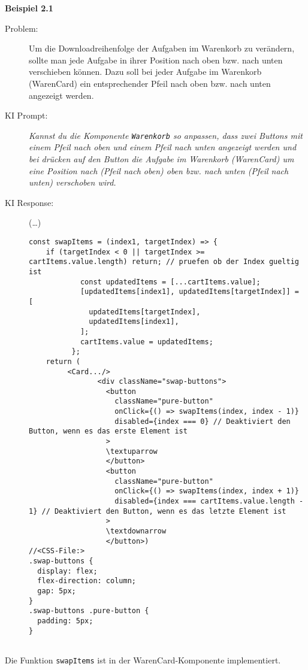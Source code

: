 \textbf{Beispiel 2.1} 
\begin{description}
    \item[Problem:] 
Um die Downloadreihenfolge der Aufgaben im Warenkorb zu verändern, sollte man jede Aufgabe in ihrer Position nach oben bzw. nach unten verschieben können. Dazu soll bei jeder Aufgabe im Warenkorb (WarenCard) ein entsprechender Pfeil nach oben bzw. nach unten angezeigt werden. 
    \item[KI Prompt:] \emph{ Kannst du die Komponente \texttt{Warenkorb} so anpassen, dass zwei Buttons mit einem Pfeil nach oben und einem Pfeil nach unten angezeigt werden und bei drücken auf den Button die Aufgabe im Warenkorb (WarenCard) um eine Position nach (Pfeil nach oben) oben bzw. nach unten (Pfeil nach unten) verschoben wird. }
    \item[KI Response:] (\ldots)
\begin{lstlisting}
const swapItems = (index1, targetIndex) => {
    if (targetIndex < 0 || targetIndex >= cartItems.value.length) return; // pruefen ob der Index gueltig ist
            const updatedItems = [...cartItems.value];
            [updatedItems[index1], updatedItems[targetIndex]] = [
              updatedItems[targetIndex],
              updatedItems[index1],
            ];
            cartItems.value = updatedItems;
          };
    return (
         <Card.../>
                <div className="swap-buttons">
                  <button
                    className="pure-button"
                    onClick={() => swapItems(index, index - 1)}
                    disabled={index === 0} // Deaktiviert den Button, wenn es das erste Element ist
                  >
                  \textuparrow
                  </button>
                  <button
                    className="pure-button"
                    onClick={() => swapItems(index, index + 1)}
                    disabled={index === cartItems.value.length - 1} // Deaktiviert den Button, wenn es das letzte Element ist
                  >
                  \textdownarrow
                  </button>)
//<CSS-File:>
.swap-buttons {
  display: flex;
  flex-direction: column;
  gap: 5px;
}
.swap-buttons .pure-button {
  padding: 5px;
}


    \end{lstlisting}
\end{description}

Die Funktion \texttt{swapItems} ist in der WarenCard-Komponente implementiert. 


